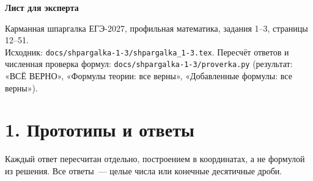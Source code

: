 \documentclass[fontsize=10pt]{scrartcl}
\begin{document}
{\LARGE\bfseries Лист для эксперта\par}
\smallskip
Карманная шпаргалка ЕГЭ-2027, профильная математика, задания 1–3, страницы 12–51.\\
Исходник: \texttt{docs/shpargalka-1-3/shpargalka\_1-3.tex}. Пересчёт ответов и численная проверка формул:
\texttt{docs/shpargalka-1-3/proverka.py} (результат: «ВСЁ ВЕРНО», «Формулы теории: все верны», «Добавленные формулы: все верны»).

\section*{1. Прототипы и ответы}
Каждый ответ пересчитан отдельно, построением в координатах, а не формулой из решения. Все ответы~— целые числа или конечные десятичные дроби.
\end{document}
